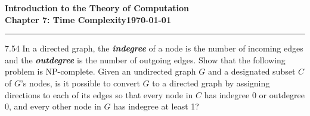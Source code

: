 \documentclass[11pt]{article}
\newcommand{\dated}{\today}
\begin{document}
\textbf{Introduction to the Theory of
Computation}\hfill\textbf{\myname}\\[0.01in]
\textbf{Chapter 7: Time Complexity}\hfill\textbf{\dated}\\
\smallskip\hrule\bigskip

\begin{problem}{7.54}
In a directed graph, the \textbf{\textit{indegree}} of a node is the number of incoming edges and the \textbf{\textit{outdegree}} is the number of outgoing edges. Show that the following problem is NP-complete. Given an undirected graph $G$ and a designated subset $C$ of $G$'s nodes, is it possible to convert $G$ to a directed graph by assigning directions to each of its edges so that every node in $C$ has indegree 0 or outdegree 0, and every other node in $G$ has indegree at least 1?
\end{problem}
\end{document}
